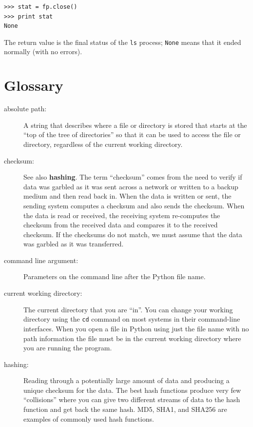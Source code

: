 \documentclass[10pt]{book}
\begin{document}

\beforeverb
\begin{verbatim}
>>> stat = fp.close()
>>> print stat
None
\end{verbatim}
\afterverb
%
The return value is the final status of the {\tt ls} process;
{\tt None} means that it ended normally (with no errors).

\section{Glossary}

\begin{description}

\item[absolute path:] A string that describes where a file or
directory is stored that starts at the ``top of the tree of directories''
so that it can be used to access the file or directory, regardless
of the current working directory.

\item[checksum:] See also {\bf hashing}.  The term ``checksum'' 
comes from the need to verify if data was garbled as it was 
sent across a network or written to a backup medium and then
read back in.  When the data is written or sent, the sending system
computes a checksum and also sends the checksum.  When the 
data is read or received, the receiving system re-computes
the checksum from the received data and compares it to the 
received checksum.  If the checksums do not match, we must
assume that the data was garbled as it was transferred.

\item[command line argument:] Parameters on the command line after the Python file name.


\item[current working directory:] The current directory that you 
are ``in''.  You can change your working directory using the 
{\tt cd} command on most systems in their command-line interfaces.
When you open a file in Python using just the file name with no path 
information the file must be in the current working directory
where you are running the program.

\item[hashing:] Reading through a potentially large amount of data
and producing a unique checksum for the data.  The best hash functions
produce very few ``collisions'' where you can give two different
streams of data to the hash function and get back the same hash. 
MD5, SHA1, and SHA256 are examples of commonly used hash functions.


\end{description}
\end{document}

